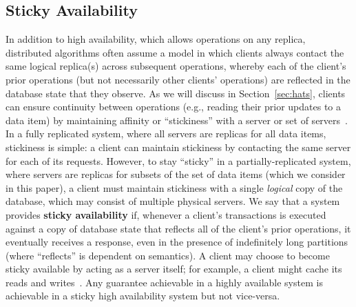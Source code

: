 \subsection{Sticky Availability}
\label{sec:sticky}

In addition to high availability, which allows operations on any
replica, distributed algorithms often assume a model in which clients
always contact the same logical replica(s) across subsequent
operations, whereby each of the client's prior operations (but not
necessarily other clients' operations) are reflected in the database
state that they observe. As we will discuss in Section~\ref{sec:hats},
clients can ensure continuity between operations (e.g., reading their
prior updates to a data item) by maintaining affinity or
``stickiness'' with a server or set of servers~\cite{vogels-defs}. In
a fully replicated system, where all servers are replicas for all data
items, stickiness is simple: a client can maintain stickiness by
contacting the same server for each of its requests. However, to stay
``sticky'' in a partially-replicated system, where servers are
replicas for subsets of the set of data items (which we consider in
this paper), a client must maintain stickiness with a single
\textit{logical} copy of the database, which may consist of multiple
physical servers. We say that a system provides \textbf{sticky
  availability} if, whenever a client's transactions is executed
against a copy of database state that reflects all of the client's
prior operations, it eventually receives a response, even in the
presence of indefinitely long partitions (where ``reflects'' is
dependent on semantics). A client may choose to become sticky
available by acting as a server itself; for example, a client might
cache its reads and writes~\cite{bolton, sessionguarantees,
  swift}. Any guarantee achievable in a highly available system is
achievable in a sticky high availability system but not vice-versa.


